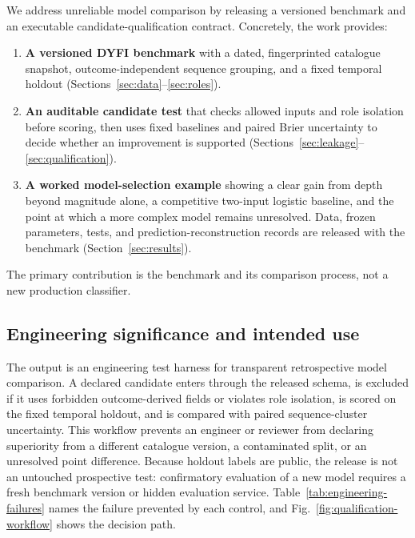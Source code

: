 \documentclass[pdflatex,sn-basic,Numbered]{sn-jnl}
\begin{document}
We address unreliable model comparison by releasing a versioned benchmark and
an executable candidate-qualification contract. Concretely, the work provides:

\begin{enumerate}
\item \textbf{A versioned DYFI benchmark} with a dated, fingerprinted catalogue
snapshot, outcome-independent sequence grouping, and a fixed temporal holdout
(Sections~\ref{sec:data}--\ref{sec:roles}).
\item \textbf{An auditable candidate test} that checks allowed inputs and role
isolation before scoring, then uses fixed baselines and paired Brier uncertainty
to decide whether an improvement is supported
(Sections~\ref{sec:leakage}--\ref{sec:qualification}).
\item \textbf{A worked model-selection example} showing a clear gain from depth
beyond magnitude alone, a competitive two-input logistic baseline, and the
point at which a more complex model remains unresolved. Data, frozen parameters,
tests, and prediction-reconstruction records are released with the benchmark
(Section~\ref{sec:results}).
\end{enumerate}

The primary contribution is the benchmark and its comparison process, not a new
production classifier.

\subsection{Engineering significance and intended use}\label{sec:significance}

The output is an engineering test harness for transparent retrospective model
comparison. A declared candidate enters through the released schema, is
excluded if it uses forbidden outcome-derived fields or violates role
isolation, is scored on the fixed temporal holdout, and is compared with paired
sequence-cluster uncertainty. This workflow prevents an engineer or reviewer
from declaring superiority from a different catalogue version, a contaminated
split, or an unresolved point difference. Because holdout labels are public,
the release is not an untouched prospective test: confirmatory evaluation of a
new model requires a fresh benchmark version or hidden evaluation service.
Table~\ref{tab:engineering-failures} names the failure prevented by each
control, and Fig.~\ref{fig:qualification-workflow} shows the decision path.


\end{document}
